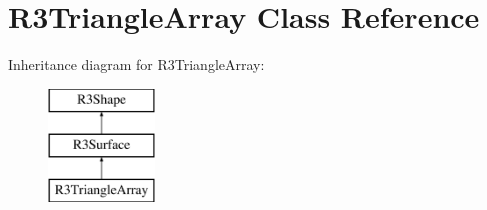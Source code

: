 \hypertarget{class_r3_triangle_array}{}\section{R3\+Triangle\+Array Class Reference}
\label{class_r3_triangle_array}
Inheritance diagram for R3\+Triangle\+Array\+:\begin{figure}[H]
\begin{center}
\leavevmode
\includegraphics[height=3.000000cm]{class_r3_triangle_array}
\end{center}
\end{figure}
